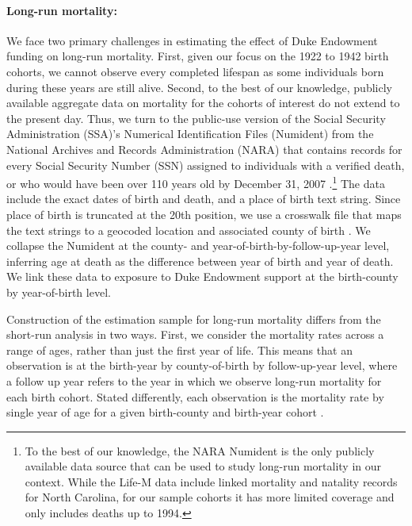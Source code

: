 \documentclass[12pt]{article}
\begin{document}
\paragraph{Long-run mortality:} We face two primary challenges in estimating the effect of Duke Endowment funding on long-run mortality.
First, given our focus on the 1922 to 1942 birth cohorts, we cannot observe every completed lifespan as some individuals born during these years are still alive.
Second, to the best of our knowledge, publicly available aggregate data on mortality for the cohorts of interest do not extend to the present day.
Thus, we turn to the public-use version of the Social Security Administration (SSA)'s Numerical Identification Files (Numident) from the National Archives and Records Administration (NARA) that contains records for every Social Security Number (SSN) assigned to individuals with a verified death, or who would have been over 110 years old by December 31, 2007 .\footnote{To the best of our knowledge, the NARA Numident is the only publicly available data source that can be used to study long-run mortality in our context. While the Life-M data include linked mortality and natality records for North Carolina, for our sample cohorts it has more limited coverage and only includes deaths up to 1994. 
}
The data include the exact dates of birth and death, and a place of birth text string.
Since place of birth is truncated at the 20th position, we use a crosswalk file that maps the text strings to a geocoded location and associated county of birth .
We collapse the Numident at the county- and year-of-birth-by-follow-up-year level, inferring age at death as the difference between year of birth and year of death.
We link these data to exposure to Duke Endowment support at the birth-county by year-of-birth level.

Construction of the estimation sample for long-run mortality differs from the short-run analysis in two ways.
First, we consider the mortality rates across a range of ages, rather than just the first year of life.
This means that an observation is at the birth-year by county-of-birth by follow-up-year level, where 
a follow up year refers to the year in which we observe long-run mortality for each birth cohort.
Stated differently, each observation is the mortality rate by single year of age for a given birth-county and birth-year cohort .
\end{document}
